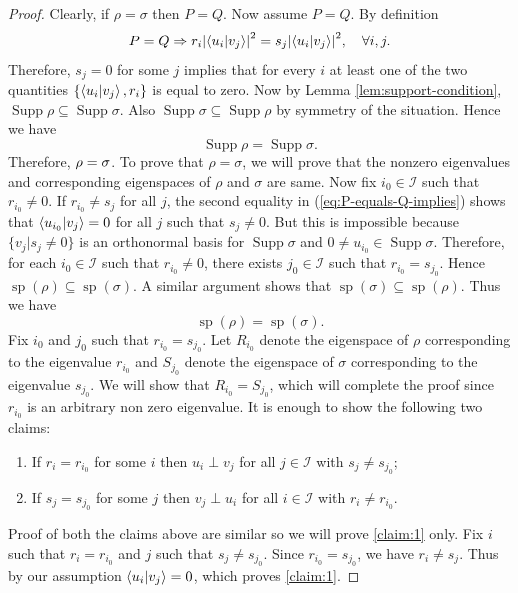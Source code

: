 \documentclass[12pt,a4paper,oneside]{article}
\numberwithin{equation}{section}
\theoremstyle{definition}  %
\theoremstyle{plain}  %
\theoremstyle{remark} %
\let\ker\relax
\DeclareMathOperator{\ker}{Ker}
\DeclareMathOperator{\supp}{Supp}
\begin{document}
\begin{proof}Clearly, if $\rho=\sigma$ then $P=Q$. Now assume $P=Q$.
By definition \begin{align}\label{eq:P-equals-Q-implies}
    P=Q \Rightarrow r_i\abs{\braket{u_i}{v_j}}^2 = s_j\abs{\braket{u_i}{v_j}}^2,\quad \forall i,j.
\end{align}
Therefore, $s_j=0$ for some $j$ implies that for every $i$ at least one of the two quantities $\{\braket{u_i}{v_j}, r_i \}$ is equal to zero. Now by Lemma \ref{lem:support-condition}, $\supp\rho \subseteq \supp \sigma$. Also $\supp \sigma \subseteq \supp \rho$ by symmetry of the situation. Hence we have \[\supp\rho = \supp \sigma.\]
Therefore, $\ker\rho = \ker\sigma$. To prove that $\rho = \sigma$, we will prove that the nonzero eigenvalues and corresponding eigenspaces of $\rho$ and $\sigma$ are same.
Now fix $i_0\in \mathcal{I}$ such that $r_{i_0}\neq 0$. If $r_{i_0}\neq s_j$ for all $j$, the second equality in (\ref{eq:P-equals-Q-implies}) shows that $\braket{u_{i_0}}{v_j} =0$ for all $j$ such that $s_j\neq 0$. But this is impossible because $\{v_j|s_j\neq0\}$ is an orthonormal basis for $\supp \sigma$ and $0\neq u_{i_0}\in \supp \sigma$. Therefore, for each $i_0\in \mathcal{I}$ such that $r_{i_0}\neq 0$, there exists $j_0\in \mathcal{I}$ such that $r_{i_0}=s_{j_0}.$ Hence $\operatorname{sp}(\rho) \subseteq\operatorname{sp}(\sigma)$. A similar argument shows that $\operatorname{sp}(\sigma) \subseteq \operatorname{sp}(\rho)$. Thus we have  \[\operatorname{sp}(\rho) =\operatorname{sp}(\sigma).\]
Fix ${i_0}$ and ${j_0}$ such that $r_{i_0}=s_{j_0}$.
Let $R_{i_0}$ denote the eigenspace of $\rho$ corresponding to the eigenvalue $r_{i_0}$ and $S_{j_0}$ denote the eigenspace of $\sigma$ corresponding to the eigenvalue $s_{j_0}$. We will show that $R_{i_0}=S_{j_0}$, which will complete the proof since $r_{i_{0}}$ is an arbitrary non zero eigenvalue. It is enough to show the following two claims: \begin{enumerate}
    \item \label{claim:1} If $r_i=r_{i_0}$ for some $i$ then $u_i\perp v_j$ for all $j\in \mathcal{I}$ with $s_j\neq s_{j_0}$;
    \item If $s_j=s_{j_0}$ for some $j$ then $v_j\perp u_i$ for all $i\in \mathcal{I}$ with $r_i\neq r_{i_0}$.
\end{enumerate}
Proof of both the claims above are similar so we will prove \ref{claim:1} only. Fix $i$ such that $r_i=r_{i_0}$ and $j$ such that $s_j\neq s_{j_0}$. Since $r_{i_0}=s_{j_0}$, we have $r_i\neq s_j$. Thus by our assumption $\braket{u_i}{v_j}=0$, which proves \ref{claim:1}.
\end{proof}
\end{document}
